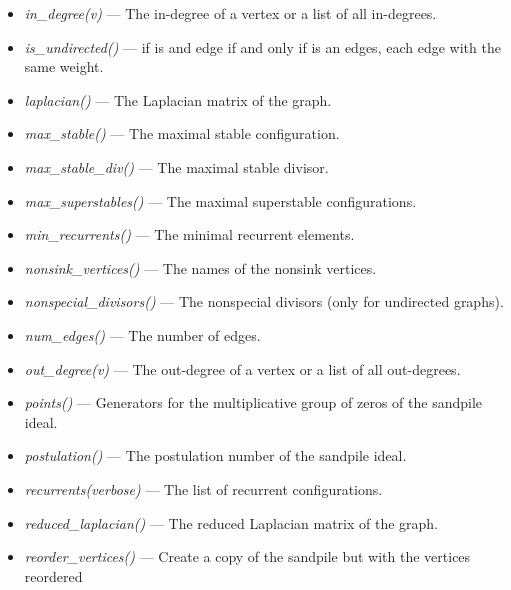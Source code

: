 \documentclass[letterpaper,10pt,english]{manual}
\begin{document}
\begin{itemize}
\item {} 
\emph{in\_degree(v)} --- The in-degree of a vertex or a list of all in-degrees.

\item {} 
\emph{is\_undirected()} ---  if  is and edge if and only if  is an edges, each edge with the same weight.

\item {} 
\emph{laplacian()} --- The Laplacian matrix of the graph.

\item {} 
\emph{max\_stable()} --- The maximal stable configuration.

\item {} 
\emph{max\_stable\_div()} --- The maximal stable divisor.

\item {} 
\emph{max\_superstables()} --- The maximal superstable
configurations.

\item {} 
\emph{min\_recurrents()} --- The minimal recurrent
elements.

\item {} 
\emph{nonsink\_vertices()} --- The names of the nonsink vertices.

\item {} 
\emph{nonspecial\_divisors()} --- The nonspecial
divisors (only for undirected graphs).

\item {} 
\emph{num\_edges()} --- The number of edges.

\item {} 
\emph{out\_degree(v)} --- The out-degree of a vertex or a list of all out-degrees.

\item {} 
\emph{points()} --- Generators for the multiplicative group of
zeros of the sandpile ideal.

\item {} 
\emph{postulation()} --- The postulation number of the sandpile ideal.

\item {} 
\emph{recurrents(verbose)} --- The list of recurrent
configurations.

\item {} 
\emph{reduced\_laplacian()} --- The reduced Laplacian matrix of the graph.

\item {} 
\emph{reorder\_vertices()} --- Create a copy of the
sandpile but with the vertices reordered


\end{itemize}
\end{document}
